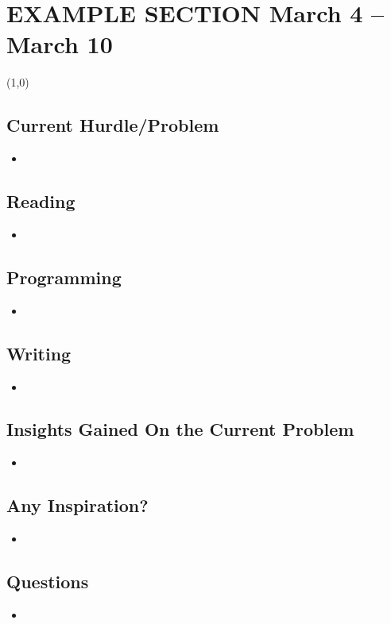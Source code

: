 \documentclass{article}
\begin{document}
\newpage


\iffalse
\section{EXAMPLE SECTION March 4 -- March 10}
\line(1,0){\linewidth}

\subsection{Current Hurdle/Problem}
\begin{itemize}
\item 
\end{itemize}
\subsection{Reading}
\begin{itemize}
\item 
\end{itemize}

\subsection{Programming}
\begin{itemize}
\item 
\end{itemize}
\subsection{Writing}
\begin{itemize}
\item 
\end{itemize}
\subsection{Insights Gained On the Current Problem}
\begin{itemize}
\item 
\end{itemize}
\subsection{Any Inspiration?}
\begin{itemize}
\item 
\end{itemize}
\subsection{Questions}
\begin{itemize}
\item 
\end{itemize}
\end{document}
